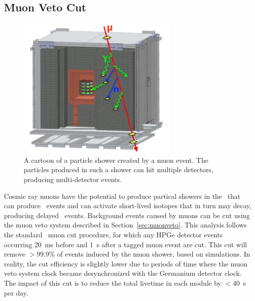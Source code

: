 \documentclass[/main.tex]{subfiles}
\begin{document}
\subsection{Muon Veto Cut}
\begin{figure}
  \centering
  \includegraphics[width=0.7\textwidth]{muonevent}
  \caption[Example muon event]{\label{fig:muonevent}
    A cartoon of a particle shower created by a muon event. The particles produced in such a shower can hit multiple detectors, producing multi-detector events.
  }
\end{figure}
Cosmic ray muons have the potential to produce partical showers in the \MJD\ that can produce \msmd\ events and can activate short-lived isotopes that in turn may decay, producing delayed \msmd\ events.
Background events caused by muons can be cut using the muon veto system described in Section~\ref{sec:muonveto}.
This analysis follows the standard \MJD\ muon cut procedure, for which any HPGe detector events occurring 20~ms before and 1~s after a tagged muon event are cut.
This cut will remove $>99.9$\% of events induced by the muon shower, based on simulations\cite{2015wiseman}.
In reality, the cut efficiency is slightly lower due to periods of time where the muon veto system clock became desynchronized with the Germanium detector clock.
The impact of this cut is to reduce the total livetime in each module by $<40$~s per day\cite{2015wiseman}.
\end{document}
